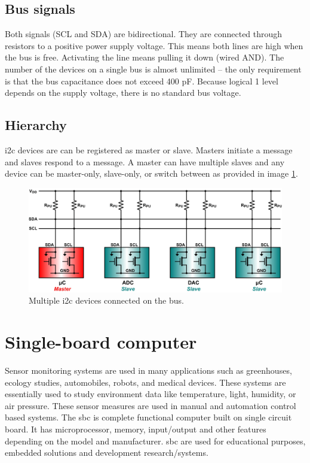 \subsection{Bus signals} %
 \label{sub:bus_signals}
Both signals (SCL and SDA) are bidirectional. They are connected through resistors to a positive power supply voltage. This means both lines are high when the bus is free. Activating the line means pulling it down (wired AND). The number of the devices on a single bus is almost unlimited – the only requirement is that the bus capacitance does not exceed 400 pF. Because logical 1 level depends on the supply voltage, there is no standard bus voltage.\cite{i2c_bus_signal}
\subsection{Hierarchy} %
\label{sub:hierarchy}
\gls{i2c} devices are can be registered as master or slave. Masters initiate a message and
slaves respond to a message. A master can have multiple slaves and any device can
be master-only, slave-only, or switch between as provided in image \ref{fig:ch1}.
\begin{figure}[H]
\begin{center}
\captionsetup{font=small}
\includegraphics[scale=0.2]{pics/i2c-hierarchy.png}
\caption{Multiple \gls{i2c} devices connected on the bus.}
\label{fig:ch1}
\end{center}
\end{figure}

\section{Single-board computer}
Sensor monitoring systems are used in many applications such as greenhouses, ecology studies, automobiles, robots, and medical devices. These systems are essentially used to study environment data like temperature, light, humidity, or air pressure. These sensor measures are used in manual and automation control based systems\cite{6028693}. The \gls{sbc} is complete functional computer built on single circuit board. It has microprocessor, memory, input/output and other features depending on the model and manufacturer. \gls{sbc} are used for educational purposes, embedded solutions and development research/systems.

